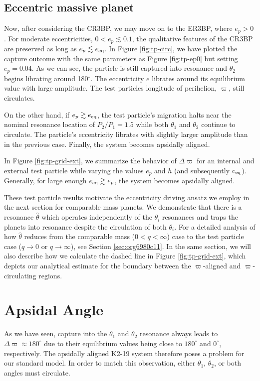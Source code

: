 \documentclass[usenatbib,twocolumn]{mnras}
\begin{document}
\subsection{Eccentric massive planet}
\label{sec:org667d3fa}
Now, after considering the
CR3BP, we may move on to the ER3BP, where \(e_p>0\).  For moderate
eccentricities, \(0<e_p\lesssim 0.1\), the qualitative features of the
CR3BP are preserved as long as \(e_p \lesssim e_{\rm eq}\). In Figure
\ref{fig:tp-circ}, we have plotted the capture outcome with the same
parameters as Figure \ref{fig:tp-ep0} but setting \(e_p = 0.04\). As we
can see, the particle is still captured into resonance and \(\theta_2\)
begins librating around 180\(^\circ\). The eccentricity \(e\) librates
around its equilibrium value with large amplitude. The test particles
longitude of perihelion, \(\varpi\), still circulates.

On the other hand, if \(e_p \gtrsim e_{\rm eq}\), the test particle's
migration halts near the nominal resonance location of \(P_2/P_1=1.5\)
while both \(\theta_1\) and \(\theta_2\) continue to circulate. The particle's
eccentricity librates with slightly larger amplitude than
in the previous case. Finally, the system becomes apsidally aligned.

In Figure \ref{fig:tp-grid-ext}, we summarize the behavior of
\(\Delta\varpi\) for an internal and external test particle while
varying the values \(e_p\) and \(h\) (and subsequently \(e_{\rm
eq}\)). Generally, for large enough \(e_{\rm eq}\gtrsim e_p\), the system
becomes apsidally aligned.

These test particle results motivate the eccentricity driving ansatz
we employ in the next section for comparable mass planets. We
demonstrate that there is a resonance \(\hat\theta\) which operates
independently of the \(\theta_i\) resonances and traps the planets into
resonance despite the circulation of both \(\theta_i\). For a detailed
analysis of how \(\hat\theta\) reduces from the comparable mass
(\(0<q<\infty\)) case to the test particle case (\(q\to0\) or
\(q\to\infty\)), see Section \ref{sec:org6980c11}. In the same section,
we will also describe how we calculate the dashed line in Figure
\ref{fig:tp-grid-ext}, which depicts our analytical estimate for the
boundary between the $\varpi$-aligned and $\varpi$-circulating
regions.

\section{Apsidal Angle}
\label{sec:orga7aba60}
As we have seen, capture into the \(\theta_1\) and \(\theta_2\) resonance
always leads to \(\Delta\varpi\approx 180^\circ\) due to their
equilibrium values being close to \(180^\circ\) and \(0^\circ\),
respectively.  The apsidally aligned K2-19 system therefore poses a
problem for our standard model.  In order to match this observation,
either \(\theta_1\), \(\theta_2\), or both angles must circulate.
\end{document}
